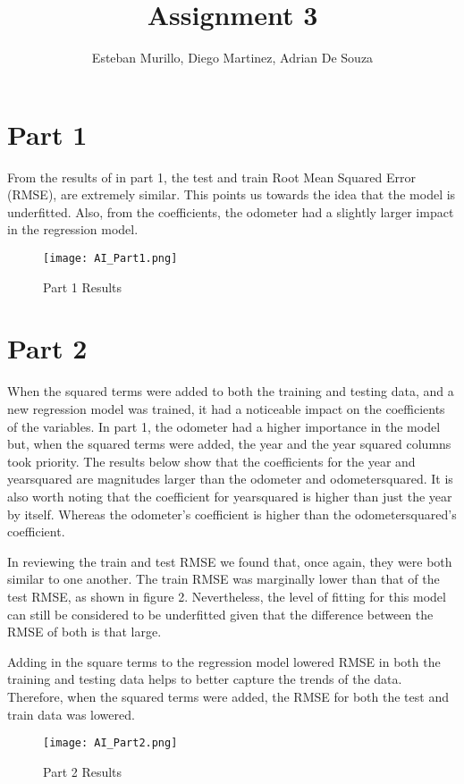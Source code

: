 \documentclass[12pt]{article}
\title{Assignment 3}
\author{Esteban Murillo, Diego Martinez, Adrian De Souza}
\begin{document}
\maketitle

\section*{Part 1}
From the results of in part 1, the test and train Root Mean Squared Error (RMSE), are extremely similar. This points us towards the idea that the model is underfitted. Also, from the coefficients, the odometer had a slightly larger impact in the regression model.
\begin{figure}[h]
    \centering
    \texttt{[image: AI\_Part1.png]}
    \caption{Part 1 Results}
    \label{fig:placeholder}
\end{figure}
\section*{Part 2}
When the squared terms were added to both the training and testing data, and a new regression model was trained, it had a noticeable impact on the coefficients of the variables. In part 1, the odometer had a higher importance in the model but, when the squared terms were added, the year and the year squared columns took priority. The results below show that the coefficients for the year and year\textunderscore squared are magnitudes larger than the odometer and odometer\textunderscore squared. It is also worth noting that the coefficient for year\textunderscore squared is higher than just the year by itself. Whereas the odometer's coefficient is higher than the odometer\textunderscore squared's coefficient. 

In reviewing the train and test RMSE we found that, once again, they were both similar to one another. The train RMSE was marginally lower than that of the test RMSE, as shown in figure 2. Nevertheless, the level of fitting for this model can still be considered to be underfitted given that the difference between the RMSE of both is that large.

Adding in the square terms to the regression model lowered RMSE in both the training and testing data helps to better capture the trends of the data. Therefore, when the squared terms were added, the RMSE for both the test and train data was lowered.
\begin{figure}[h]
    \centering
    \texttt{[image: AI\_Part2.png]}
    \caption{Part 2 Results}
    \label{fig:placeholder}
\end{figure}
\end{document}
